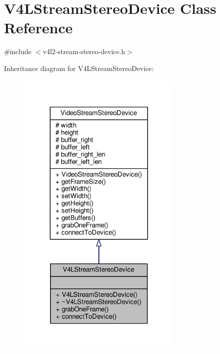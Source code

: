 \hypertarget{classV4LStreamStereoDevice}{}\section{V4\+L\+Stream\+Stereo\+Device Class Reference}
\label{classV4LStreamStereoDevice}


{\ttfamily \#include $<$v4l2-\/stream-\/stereo-\/device.\+h$>$}



Inheritance diagram for V4\+L\+Stream\+Stereo\+Device\+:
\nopagebreak
\begin{figure}[H]
\begin{center}
\leavevmode
\includegraphics[width=227pt]{classV4LStreamStereoDevice__inherit__graph}
\end{center}
\end{figure}


